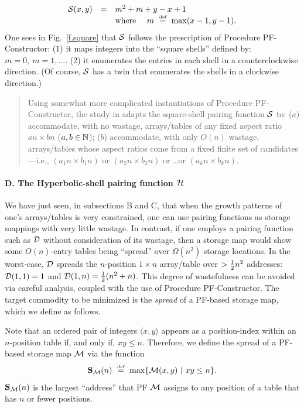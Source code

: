 \begin{equation}
\label{e.square}
\begin{array}{ccl}
\mbox{$\cal S$}(x, y) & = & m^2 + m + y-x+1 \\
 & & \mbox{where } \ \ \  m \ \stackrel{\mbox{{\tiny def}}}{=} \ \max(x-1,y-1).
\end{array}
\end{equation}
One sees in Fig.~\ref{f.square} that $\mbox{$\cal S$}$ follows the prescription of
Procedure PF-Constructor: (1) it maps integers into the ``square
shells'' defined by: $m = 0, \ m = 1, ...$.  (2) it enumerates the
entries in each shell in a counterclockwise direction.  (Of course,
$\mbox{$\cal S$}$ has a twin that enumerates the shells in a clockwise direction.)
\begin{quote}
Using somewhat more complicated instantiations of Procedure
PF-Constructor, the study in \cite{Rosenberg75} adapts the
square-shell pairing function $\mbox{$\cal S$}$ to: ($a$) accommodate, with no
wastage, arrays/tables of any fixed aspect ratio $an \times bn$ ($a,b
\in \mathbb{N}$); ($b$) accommodate, with only $O(n)$ wastage, arrays/tables
whose aspect ratios come from a fixed finite set of candidates---i.e.,
$(a_1 n \times b_1 n)$ or $(a_2 n \times b_2 n)$ or \ldots or $(a_k n
\times b_k n)$.
\end{quote}

\paragraph{\small\sf D. The Hyperbolic-shell pairing function $\mbox{$\cal H$}$}

We have just seen, in subsections B and C, that when the growth
patterns of one's arrays/tables is very constrained, one can use
pairing functions as storage mappings with very little wastage.  In
contrast, if one employs a pairing function such as $\mbox{$\cal D$}$ without
consideration of its wastage, then a storage map would show some
$O(n)$-entry tables being ``spread'' over $\Omega(n^2)$ storage
locations.  In the worst-case, $\mbox{$\cal D$}$ spreads the $n$-position $1 \times
n$ array/table over $> {1 \over 2} n^2$ addresses: $\mbox{$\cal D$}(1,1) = 1$ and
$\mbox{$\cal D$}(1,n) = {1 \over 2} (n^2 + n)$.  This degree of wastefulness can be
avoided via careful analysis, coupled with the use of Procedure
PF-Constructor.  The target commodity to be minimized is the {\it
  spread} of a PF-based storage map, which we define as follows.

Note that an ordered pair of integers $\langle x,y \rangle$ appears as
a position-index within an $n$-position table if, and only if, $xy
\leq n$.  Therefore, we define the spread of a PF-based storage map
$\mbox{$\cal M$}$ via the function
\begin{equation}
\label{e.compact}
{\bf S}_{\cal M}(n) \ \stackrel{\mbox{{\tiny def}}}{=} \ \max\{ \mbox{$\cal M$}(x, y) \ | \ xy \leq n \}.
\end{equation}
${\bf S}_{\cal M}(n)$ is the largest ``address'' that PF $\mbox{$\cal M$}$ assigns
to any position of a table that has $n$ or fewer positions.

